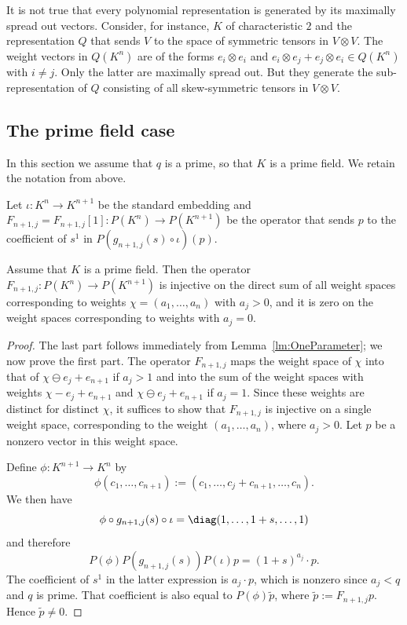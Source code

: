 \documentclass{amsart}
\newcommand{\omin}{\ominus}
\begin{document}
\begin{ex} \label{ex:NotSpread}
It is not true that every polynomial representation is generated by
its maximally spread out vectors. Consider, for instance,
$K$ of characteristic $2$ and the representation $Q$ that sends $V$ to the space of symmetric tensors
in $V \otimes V$. The weight vectors in $Q(K^n)$ are of the forms $e_i
\otimes e_i$ and $e_i \otimes e_j + e_j \otimes e_i \in Q(K^n)$ with $i
\neq j$.  Only the latter are maximally spread out. But they generate
the sub-representation of $Q$ consisting of all skew-symmetric tensors
in $V \otimes V$.
\end{ex}

\subsection{The prime field case}

In this section we assume that $q$ is a prime, so that $K$ is a prime
field. We retain the notation from above.

\begin{de}
Let $\iota:K^n \to K^{n+1}$ be the standard embedding and
$F_{n+1,j}=F_{n+1,j}[1]:P(K^n) \to P(K^{n+1})$ be the operator that
sends $p$ to the coefficient of $s^1$ in $P(g_{n+1,j}(s) \circ \iota)(p)$.
\end{de}

\begin{lm} \label{lm:Indep}
Assume that $K$ is a prime field. Then the operator $F_{n+1,j}:P(K^n)
\to P(K^{n+1})$ is injective on the direct sum of all weight spaces
corresponding to weights $\chi=(a_1,\ldots,a_n)$ with $a_j
> 0$, and it is zero on the weight spaces corresponding to
weights with $a_j=0$. 
\end{lm}

\begin{proof}
The last part follows immediately from
Lemma~\ref{lm:OneParameter}; we now prove the first part.
The operator $F_{n+1,j}$ maps the weight space of $\chi$ into that of
$\chi \omin e_j + e_{n+1}$ if $a_j>1$ and into the sum of the weight
spaces with weights $\chi - e_j + e_{n+1}$ and $\chi \omin e_j + e_{n+1}$
if $a_j=1$. Since these weights are distinct for distinct $\chi$, it
suffices to show that $F_{n+1,j}$ is injective on a single weight space,
corresponding to the weight $(a_1,\ldots,a_n)$, where
$a_j>0$. Let $p$ be a nonzero vector in this weight space. 

Define $\phi:K^{n+1} \to K^{n}$ by
\[
\phi(c_1,\dots,c_{n+1}):=(c_1,\ldots,c_j+c_{n+1},\ldots,c_n).
\]
We then have 
\[ \phi \circ g_{n+1,j}(s) \circ \iota=\diag(1,\dots,1+s,\dots,1) \]
and therefore 
\[ P(\phi) P(g_{n+1,j}(s)) P(\iota) p = (1+s)^{a_j} \cdot p. \]
The coefficient of $s^1$ in the latter expression is $a_j \cdot p$, which
is nonzero since $a_j<q$ and $q$ is prime. That coefficient is also equal
to $P(\phi)\tilde{p}$, where $\tilde{p}:=F_{n+1,j}p$. Hence
$\tilde{p} \neq 0$.
\end{proof}
\end{document}
